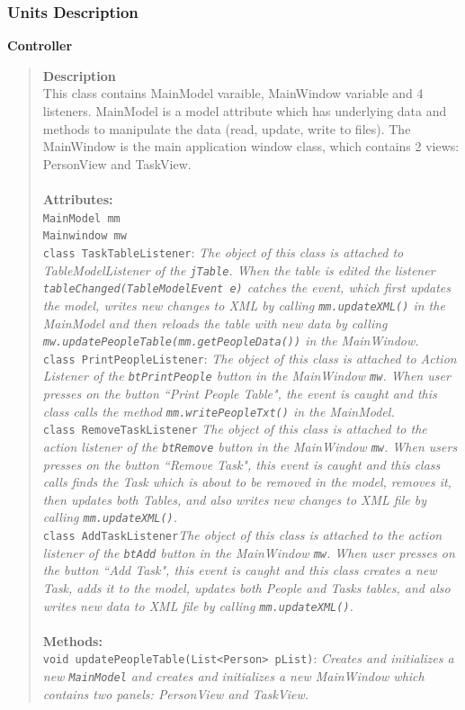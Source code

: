 \documentclass[12pt]{article}
\begin{document}
\subsubsection{Units Description}

{\bf Controller}
\begin{quote}
{\bf Description}\\
This class contains MainModel varaible, MainWindow variable and 4 listeners. MainModel is a model attribute which has underlying data and methods to manipulate the data (read, update, write to files). The MainWindow is the main application window class, which contains 2 views: PersonView and TaskView.\\\\
{\bf Attributes:}\\
\texttt{MainModel mm}\\
\texttt{Mainwindow mw}\\ 
\texttt{class TaskTableListener}: \emph{The object of this class is attached to TableModelListener of the \texttt{jTable}.  When the table is edited the listener\\ \texttt{tableChanged(TableModelEvent e)} catches the event, which first updates the model, writes new changes to XML by calling \texttt{mm.updateXML()} in the MainModel and then reloads the table with new data by calling\\ \texttt{mw.updatePeopleTable(mm.getPeopleData())} in the MainWindow.  }\\
\texttt{class PrintPeopleListener}: \emph{The object of this class is attached to Action Listener of the \texttt{btPrintPeople} button in the MainWindow \texttt{mw}. When user presses on the button ``Print People Table", the event is caught and this class calls the method \texttt{mm.writePeopleTxt()} in the MainModel.}\\
\texttt{class RemoveTaskListener} \emph{The object of this class is attached to the action listener of the \texttt{btRemove} button in the MainWindow \texttt{mw}.  When users presses on the button ``Remove Task", this event is caught and this class calls finds the Task which is about to be removed in the model,  removes it, then updates both Tables, and also writes new changes to XML file by calling \texttt{mm.updateXML()}.}\\
\texttt{class AddTaskListener}\emph{The object of this class is attached to the action listener of the \texttt{btAdd} button in the MainWindow \texttt{mw}. When user presses on the button ``Add Task", this event is caught and this class creates a new Task, adds it to the model, updates both People and Tasks tables, and also writes new data to XML file by calling \texttt{mm.updateXML()}.}\\\\
{\bf Methods:}\\
\texttt{void updatePeopleTable(List<Person> pList)}: \emph{Creates and initializes a new \texttt{MainModel} and creates and initializes a new MainWindow which contains two panels: PersonView and TaskView.}
\end{quote}
\end{document}
